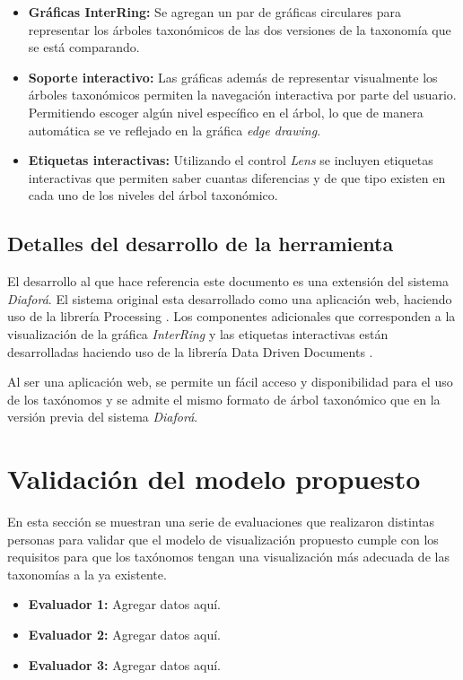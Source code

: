 \documentclass[journal]{IEEEtran}
\begin{document}
\begin{itemize}
  \item \textbf{Gráficas InterRing:} Se agregan un par de gráficas circulares para representar los árboles taxonómicos de las
  dos versiones de la taxonomía que se está comparando.
  \item  \textbf{Soporte interactivo:} Las gráficas además de representar visualmente los árboles taxonómicos permiten la navegación interactiva
  por parte del usuario. Permitiendo escoger algún nivel específico en el árbol, lo que de manera automática se ve reflejado en la gráfica \emph{edge drawing}.
  \item \textbf{Etiquetas interactivas:} Utilizando el control \emph{Lens} se incluyen etiquetas interactivas que permiten saber cuantas diferencias y de que tipo existen
  en cada uno de los niveles del árbol taxonómico.
\end{itemize}

\subsection{Detalles del desarrollo de la herramienta}
El desarrollo al que hace referencia este documento es una extensión del sistema \emph{Diaforá}\cite{sancho_diafora}.
El sistema original esta desarrollado como una aplicación web, 
haciendo uso de la librería Processing \cite{p5js2020}.
Los componentes adicionales que corresponden a la visualización de la gráfica \emph{InterRing} y las etiquetas
interactivas están desarrolladas haciendo uso de la librería Data Driven Documents \cite{DDD}.

Al ser una aplicación web, se permite un fácil acceso y disponibilidad para el uso de los taxónomos y se admite el 
mismo formato de árbol taxonómico que en la versión previa del sistema \emph{Diaforá}.

\section{Validación del modelo propuesto}
En esta sección se muestran una serie de evaluaciones que realizaron distintas personas para validar que el modelo de 
visualización propuesto cumple con los requisitos para que los taxónomos 
tengan una visualización más adecuada de las taxonomías a la ya existente.
\newline
\begin{itemize}
  \item \textbf{Evaluador 1:} Agregar datos aquí.
  \item \textbf{Evaluador 2:} Agregar datos aquí.
  \item \textbf{Evaluador 3:} Agregar datos aquí.\\
\end{itemize}
\end{document}

